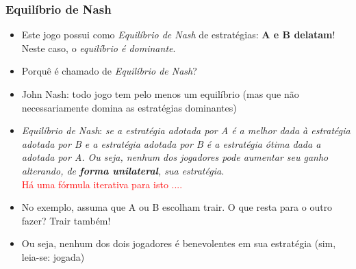  
\begin{frame}
    \frametitle{Equilíbrio de Nash}

 \begin{itemize}
   
\item Este jogo possui como \textit{Equilíbrio de Nash} de estratégias: 
\textbf{A e B delatam}! Neste caso, o \textit{equilíbrio é dominante}.

\item Porquê é chamado de \textit{Equilíbrio de Nash}?
\pause
 
 \item John Nash: todo jogo tem pelo menos um equilíbrio (mas que não necessariamente domina as estratégias dominantes)
 
\item \textit{Equilíbrio de Nash}: \textit{se a estratégia adotada por A é a melhor dada à estratégia adotada por B e a estratégia adotada por B é a estratégia ótima dada a adotada por A. Ou seja, nenhum dos jogadores pode aumentar seu ganho alterando, de \textbf{forma unilateral}, sua estratégia.}\\
\textcolor{red}{Há uma fórmula iterativa para isto ....}
\pause
 
\item No exemplo, assuma que A ou B escolham trair. O que resta para o outro fazer? Trair também! 

\item Ou seja, nenhum dos dois jogadores é benevolentes em sua estratégia (sim, leia-se: jogada)
 

 \end{itemize}

\end{frame}


